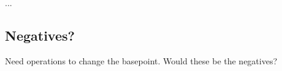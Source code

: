 \documentclass[11pt]{article}
\makeatletter
\def\wirechart#1#2{\let\labelstyle\objectstyle\xy*[*1.0]\xybox{\small%
\xymatrix@C=10mm@R=4mm#1{#2}}\endxy}
\def\wire#1#2{\ar@{-}[#1]^<>(.5){#2}}
\def\wireright#1#2{\wire{#1}{#2}\ar@{}[#1]|<>(.5)/.6ex/{\dir2{>}}}
\def\wwblank#1{*=<#1,0mm>{~}}
\def\blank{\wwblank{8mm}}
\def\wirecross#1{\save[]!L;[#1]!R**@{-}\restore}
\def\wirebraid#1#2{\save[]!L;[#1]!R**{}?(#2)**@{-}\restore\save[#1]!R;[]!L**{}?(#2)**@{-}\restore}
\newtheorem{n-example}[n-lemma]{Example}
\newenvironment{example}{\begin{n-example}}{\end{n-example}}
\newcommand{\sym}{c}       %
\newcommand{\cp}{\circ}                 %
\newcommand{\symi}{\sym\inv}
\newcommand{\inv}{^{-1}}
\newcommand{\id}{\textrm{\rm id}}       %
\newcommand{\x}{\otimes}
\makeatother
\begin{document}
...


\subsection{Negatives?} 

Need operations to change the basepoint. Would these be the negatives?




\end{document}
